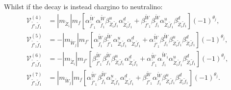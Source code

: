 \documentclass[final,3p,times,pdflatex]{elsarticle}
\begin{document}
Whilst if the decay is instead chargino to neutralino:
\begin{align}
\mathcal{V}_{\tilde{f'}_1 \tilde{f}_1}^{(4)} &= |m_{\tilde{Z}_i}| m_{f} \left[\alpha_{\tilde{f'}_1}^{\tilde{W}} \alpha_{\tilde{f}_1}^{\tilde{W}} \beta_{\tilde{Z}_i \tilde{f}_1}^{u} \alpha_{\tilde{Z}_i \tilde{f}_1}^{d} + \beta_{\tilde{f'}_1}^{\tilde{W}} \beta_{\tilde{f}_1}^{\tilde{W}} \alpha_{\tilde{Z}_i \tilde{f}_1}^{u} \beta_{\tilde{Z}_i \tilde{f}_1}^{d}\right](-1)^{\theta_j} ,\\
\mathcal{V}_{\tilde{f'}_1 \tilde{f}_1}^{(5)} &= -|m_{\tilde{W}_j}|m_{f'} \left[\alpha_{\tilde{f}_1}^{\tilde{W}} \beta_{\tilde{f'}_1}^{\tilde{W}} \alpha_{\tilde{Z}_i \tilde{f}_1}^{u} \alpha_{\tilde{Z}_i \tilde{f}_1}^{d}  + \alpha_{\tilde{f'}_1}^{\tilde{W}} \beta_{\tilde{f}_1}^{\tilde{W}} \beta_{\tilde{Z}_i \tilde{f}_1}^{u} \beta_{\tilde{Z}_i \tilde{f}_1}^{d}\right](-1)^{\theta_j} ,\\
\mathcal{V}_{\tilde{f'}_1 \tilde{f}_1}^{(6)} &= -|m_{\tilde{Z}_i}| m_{f'}\left[\beta_{\tilde{f'}_1}^{\tilde{W}}\beta_{\tilde{f}_1}^{\tilde{W}} \beta_{\tilde{Z}_i \tilde{f}_1}^{u} \alpha_{\tilde{Z}_i \tilde{f}_1}^{d}  + \alpha_{\tilde{f'}_1}^{\tilde{W}} \alpha_{\tilde{f}_1}^{\tilde{W}_1} \alpha_{\tilde{Z}_i \tilde{f}_1}^{u} \beta_{\tilde{Z}_i \tilde{f}_1}^{d}\right](-1)^{\theta_j}, \\
\mathcal{V}_{\tilde{f'}_1 \tilde{f}_1}^{(7)} &= |m_{\tilde{W}_j}|m_{f}\left[\alpha_{\tilde{f'}_1}^{\tilde{W}}\beta_{\tilde{f}_1}^{\tilde{W}} \alpha_{\tilde{Z}_i \tilde{f}_1}^{u} \alpha_{\tilde{Z}_i \tilde{f}_1}^{d} + \beta_{\tilde{f'}_1}^{\tilde{W}} \alpha_{\tilde{f}_1}^{\tilde{W}} \beta_{\tilde{Z}_i \tilde{f}_1}^{u} \beta_{\tilde{Z}_i \tilde{f}_1}^{d}\right](-1)^{\theta_j}.
\end{align}
\end{document}
